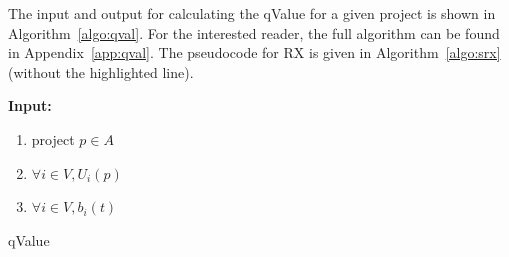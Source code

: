 \documentclass[runningheads]{llncs}
\newcommand{\kibitz}[2]{\ifnum\Comments=1{\color{#1}{#2}}\fi}
\newcommand{\rf}[1]{\kibitz{blue}{[Roy says:#1]}}
\begin{document}
\rf{update the paragraph to send the reader to the appendix for qval algo.}
The input and output for calculating the qValue for a given project is shown in Algorithm~\ref{algo:qval}. For the interested reader, the full algorithm can be found in Appendix~\ref{app:qval}.
The pseudocode for RX is given in Algorithm~\ref{algo:srx} (without the highlighted line).

\begin{algorithm}[ht]
\SetAlgoLined
\textbf{Input:} 
\begin{enumerate}
    \item project $p\in A$ \\ 
    \item $\forall i\in V,  U_i(p)$ \\
    \item $\forall i\in V,  b_i(t)$ \\
    
\end{enumerate}

 \caption{qValue}\label{algo:qval}
\end{algorithm}


 
 
 
  
   
   
\end{document}
